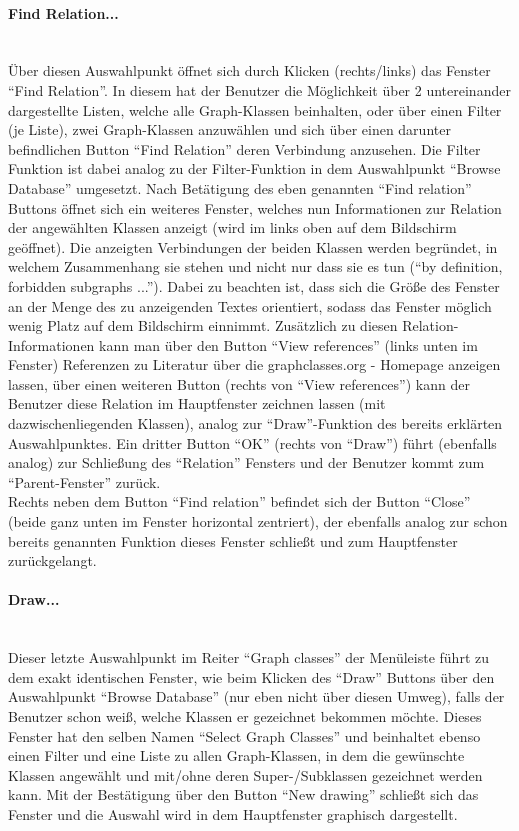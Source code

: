 \documentclass[10pt,a4paper]{article}
\begin{document}
\paragraph{Find Relation...} \ \\
Über diesen Auswahlpunkt öffnet sich durch Klicken (rechts/links) das Fenster "`Find Relation"'. In diesem hat der Benutzer die Möglichkeit über 2 untereinander dargestellte Listen, welche alle Graph-Klassen beinhalten, oder über einen Filter (je Liste), zwei Graph-Klassen anzuwählen und sich über einen darunter befindlichen Button "`Find Relation"' deren Verbindung anzusehen. Die Filter Funktion ist dabei analog zu der Filter-Funktion in dem Auswahlpunkt "`Browse Database"' umgesetzt. Nach Betätigung des eben genannten "`Find relation"' Buttons öffnet sich ein weiteres Fenster, welches nun Informationen zur Relation der angewählten Klassen anzeigt (wird im links oben auf dem Bildschirm geöffnet). Die anzeigten Verbindungen der beiden Klassen werden begründet, in welchem Zusammenhang sie stehen und nicht nur dass sie es tun ("`by definition, forbidden subgraphs ..."'). Dabei zu beachten ist, dass sich die Größe des Fenster an der Menge des zu anzeigenden Textes orientiert, sodass das Fenster möglich wenig Platz auf dem Bildschirm einnimmt. Zusätzlich zu diesen Relation-Informationen kann man über den Button "`View references"' (links unten im Fenster) Referenzen zu Literatur über die graphclasses.org - Homepage anzeigen lassen, über einen weiteren Button (rechts von "`View references"') kann der Benutzer diese Relation im Hauptfenster zeichnen lassen (mit dazwischenliegenden Klassen), analog zur "`Draw"'-Funktion des bereits erklärten Auswahlpunktes. Ein dritter Button "`OK"' (rechts von "`Draw"') führt (ebenfalls analog) zur Schließung des "`Relation"' Fensters und der Benutzer kommt zum "`Parent-Fenster"' zurück.\\
Rechts neben dem Button "`Find relation"' befindet sich der Button "`Close"' (beide ganz unten im Fenster horizontal zentriert), der ebenfalls analog zur schon bereits genannten Funktion dieses Fenster schließt und zum Hauptfenster zurückgelangt.

\paragraph{Draw...}\ \\
Dieser letzte Auswahlpunkt im Reiter "`Graph classes"' der Menüleiste führt zu dem exakt identischen Fenster, wie beim Klicken des "`Draw"' Buttons über den Auswahlpunkt "`Browse Database"' (nur eben nicht über diesen Umweg), falls der Benutzer schon weiß, welche Klassen er gezeichnet bekommen möchte. Dieses Fenster hat den selben Namen "`Select Graph Classes"' und beinhaltet ebenso einen Filter und eine Liste zu allen Graph-Klassen, in dem die gewünschte Klassen angewählt und mit/ohne deren Super-/Subklassen gezeichnet werden kann. Mit der Bestätigung über den Button "`New drawing"' schließt sich das Fenster und die Auswahl wird in dem Hauptfenster graphisch dargestellt.
\end{document}
